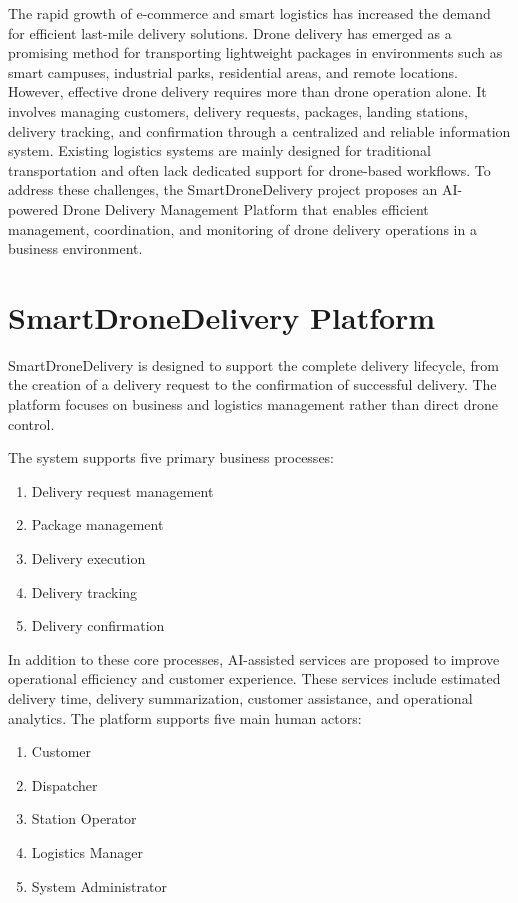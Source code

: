 The rapid growth of e-commerce and smart logistics has increased the demand for efficient last-mile delivery solutions. Drone delivery has emerged as a promising method for transporting lightweight packages in environments such as smart campuses, industrial parks, residential areas, and remote locations. However, effective drone delivery requires more than drone operation alone. It involves managing customers, delivery requests, packages, landing stations, delivery tracking, and confirmation through a centralized and reliable information system. Existing logistics systems are mainly designed for traditional transportation and often lack dedicated support for drone-based workflows. To address these challenges, the SmartDroneDelivery project proposes an AI-powered Drone Delivery Management Platform that enables efficient management, coordination, and monitoring of drone delivery operations in a business environment.
\section{SmartDroneDelivery Platform }\label{s:introduction} 

SmartDroneDelivery is designed to support the complete delivery lifecycle, from the creation of a delivery request to the confirmation of successful delivery. The platform focuses on business and logistics management rather than direct drone control.

The system supports five primary business processes:

\begin{enumerate}
\item Delivery request management
\item Package management
\item Delivery execution
\item Delivery tracking
\item Delivery confirmation
\end{enumerate}

In addition to these core processes, AI-assisted services are proposed to improve operational efficiency and customer experience. These services include estimated delivery time, delivery summarization, customer assistance, and operational analytics.
The platform supports five main human actors:

\begin{enumerate}
\item Customer
\item Dispatcher
\item Station Operator
\item Logistics Manager
\item System Administrator
\end{enumerate}

